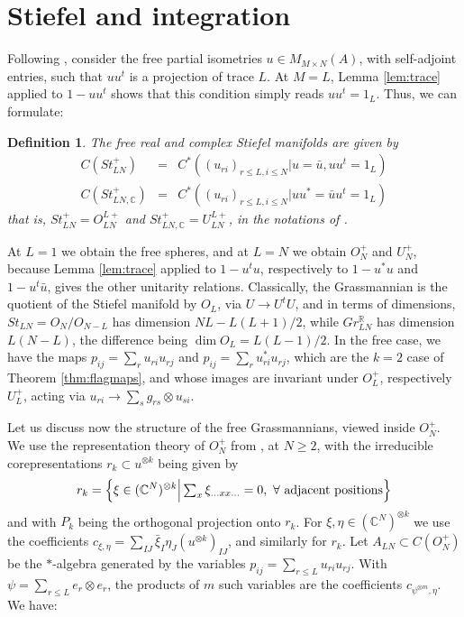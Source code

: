 \documentclass[11pt]{article}
\theoremstyle{plain}
\newtheorem{definition}[theorem]{Definition}
\begin{document}
\section{Stiefel and integration}

Following \cite{ba1}, consider the free partial isometries $u\in M_{M\times N}(A)$, with self-adjoint entries, such that $uu^t$ is a projection of trace $L$. At $M=L$, Lemma \ref{lem:trace} applied to $1-uu^t$ shows that this condition simply reads $uu^t=1_L$. Thus, we can formulate:

\begin{definition}
The free real and complex Stiefel manifolds are given by
\begin{eqnarray*}
C(St^+_{LN})&=&C^*\left((u_{ri})_{r\leq L,i\leq N}\Big|u=\bar{u},uu^t=1_L\right)\\
C(St^+_{LN,\mathbb C})&=&C^*\left((u_{ri})_{r\leq L,i\leq N}\Big|uu^*=\bar{u}u^t=1_L\right)
\end{eqnarray*}
that is, $St^+_{LN}=O_{LN}^{L+}$ and $St^+_{LN,\mathbb C}=U_{LN}^{L+}$, in the notations of \cite{ba1}.
\end{definition}

At $L=1$ we obtain the free spheres, and at $L=N$ we obtain $O_N^+$ and $U_N^+$, because Lemma \ref{lem:trace} applied to $1-u^tu$, respectively to $1-u^*u$ and $1-u^t\bar{u}$, gives the other unitarity relations. Classically, the Grassmannian is the quotient of the Stiefel manifold by $O_L$, via $U\to U^tU$, and in terms of dimensions, $St_{LN}=O_N/O_{N-L}$ has dimension $NL-L(L+1)/2$, while $Gr^\mathbb R_{LN}$ has dimension $L(N-L)$, the difference being $\dim O_L=L(L-1)/2$. In the free case, we have the maps $p_{ij}=\sum_ru_{ri}u_{rj}$ and $p_{ij}=\sum_ru_{ri}^*u_{rj}$, which are the $k=2$ case of Theorem \ref{thm:flagmaps}, and whose images are invariant under $O_L^+$, respectively $U_L^+$, acting via $u_{ri}\to\sum_sg_{rs}\otimes u_{si}$.

\bigskip

Let us discuss now the structure of the free Grassmannians, viewed inside $O_N^+$. We use the representation theory of $O_N^+$ from \cite{ba1}, at $N\geq2$, with the irreducible corepresentations $r_k\subset u^{\otimes k}$ being given by
$$r_k=\left\{\xi\in(\mathbb C^N)^{\otimes k}\Big|\textstyle\sum_x\xi_{\ldots xx\ldots}=0,\ \forall\ {\rm adjacent\ positions}\right\}$$
and with $P_k$ being the orthogonal projection onto $r_k$. For $\xi,\eta\in(\mathbb C^N)^{\otimes k}$ we use the coefficients $c_{\xi,\eta}=\sum_{IJ}\bar{\xi}_I\eta_J(u^{\otimes k})_{IJ}$, and similarly for $r_k$. Let $A_{LN}\subset C(O_N^+)$ be the $*$-algebra generated by the variables $p_{ij}=\sum_{r\leq L}u_{ri}u_{rj}$. With $\psi=\sum_{r\leq L}e_r\otimes e_r$, the products of $m$ such variables are the coefficients $c_{\psi^{\otimes m},\eta}$. We have:
\end{document}
